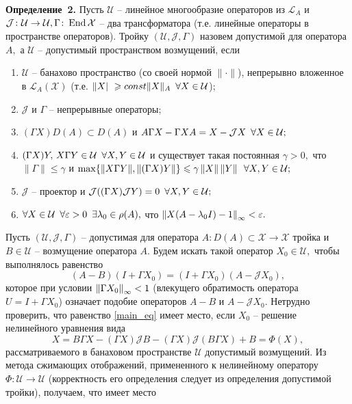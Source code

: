 \textbf{Определение~2.}
Пусть $\mathcal{U}$ -- линейное многообразие операторов из $\mathcal{L}_A$ и $\mathcal{J} \colon \mathcal{U}\to \mathcal{U}, \Gamma \colon \operatorname{End}\mathcal{X}$ -- два трансформатора (т.е. линейные операторы в пространстве операторов). Тройку $(\mathcal{U}, \mathcal{J}, \Gamma)$ назовем допустимой для оператора $A,$ а $\mathcal{U}$ -- допустимый пространством возмущений, если 
\begin{enumerate}
\item $\mathcal{U}$ -- банахово пространство (со своей нормой $\| \cdot \|$), непрерывно вложенное в $\mathcal{L}_A(\mathcal{X})$ (т.е. $\| X |\ \geqslant const\| X \|_A \enskip \forall X \in \mathcal{U}$);
\item $\mathcal{J}$ и $\Gamma$ -- непрерывные операторы;
\item $(\Gamma X)D(A) \subset D(A)$ и $A\Gamma X - \Gamma X A = X - \mathcal{J} X \enskip \forall X  \in \mathcal{U};$
\item $(\Gamma X)Y, \, X\Gamma Y \in \mathcal{U} \enskip \forall X, Y \in \mathcal{U}$ и существует такая постоянная $\gamma > 0,$ что $\| \Gamma \| \leqslant \gamma$ и $\max \{ \| X\Gamma Y \|, \| (\Gamma X)Y \| \} \leqslant \gamma \left\|X\right\| \left\|Y\right\| \enskip \forall X, Y \in \mathcal{U};$
\item $\mathcal{J}$ -- проектор и $\mathcal{J}((\Gamma X)\mathcal{J} Y) = 0 \enskip \forall X, Y \in \mathcal{U};$
\item $\forall X \in \mathcal{U} \enskip \forall \varepsilon > 0 \enskip \exists \lambda_0 \in \rho (A),$ что $\left\|X(A - \lambda_0I)-1\right\|_\infty < \varepsilon.$ 
\end{enumerate}

Пусть $(\mathcal{U}, \mathcal{J}, \Gamma)$ -- допустимая для оператора $A \colon D(A) \subset \mathcal{X} \to \mathcal{X}$ тройка и $B \in \mathcal{U}$ -- возмущение оператора $A.$ Будем искать такой оператор $X_0 \in \mathcal{U},$ чтобы выполнялось равенство
\begin{equation}
(A - B)(I + \Gamma X_0) = (I + \Gamma X_0)(A - \mathcal{J} X_0),
\label{main_eq}
\end{equation}
которое при условии $\left\|\Gamma X_0\right\|_\infty < 1$ (влекущего обратимость оператора \linebreak ${U = I + \Gamma X_0}$) означает подобие операторов $A - B$ и $A - \mathcal{J} X_0.$ Нетрудно проверить, что равенство \eqref{main_eq} имеет место, если $X_0$ -- решение нелинейного уравнения вида
\begin{equation}\label{eq:x_main}
	X = B\Gamma X - (\Gamma X) \mathcal{J} B - (\Gamma X) \mathcal{J}(B\Gamma X) + B = \Phi(X),
\end{equation} 
рассматриваемого в банаховом пространстве $\mathcal{U}$ допустимый возмущений. Из метода сжимающих отображений, примененного к нелинейному оператору $\Phi \colon \mathcal{U} \to \mathcal{U}$ (корректность его определения следует из определения допустимой тройки), получаем, что имеет место

